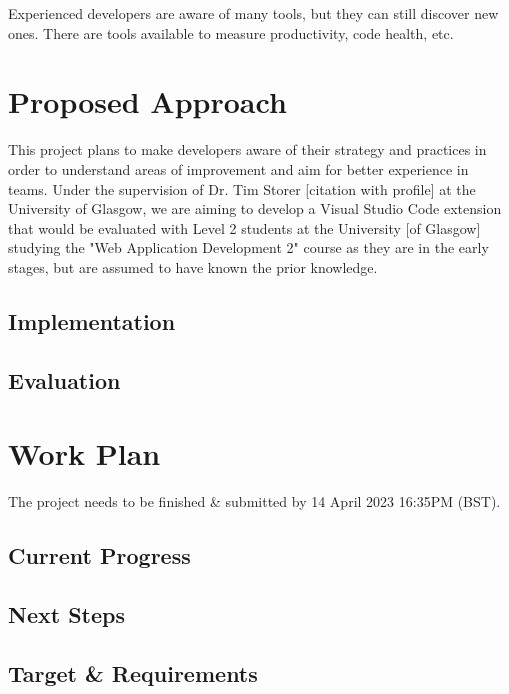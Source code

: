 \documentclass{mprop}
\begin{document}
Experienced developers are aware of many tools, but they can still discover new ones. There are tools available to measure productivity, code health, etc.

\section{Proposed Approach}



This project plans to make developers aware of their strategy and practices in order to understand areas of improvement and aim for better experience in teams. Under the supervision of Dr. Tim Storer [citation with profile] at the University of Glasgow, we are aiming to develop a Visual Studio Code extension that would be evaluated with Level 2 students at the University [of Glasgow] studying the "Web Application Development 2" course as they are in the early stages, but are assumed to have known the prior knowledge.

\subsection{Implementation}

\subsection{Evaluation}

\section{Work Plan}


The project needs to be finished \& submitted by 14 April 2023 16:35PM (BST).

\subsection{Current Progress}

\subsection{Next Steps}

\subsection{Target \& Requirements}


\printbibliography%
\end{document}
